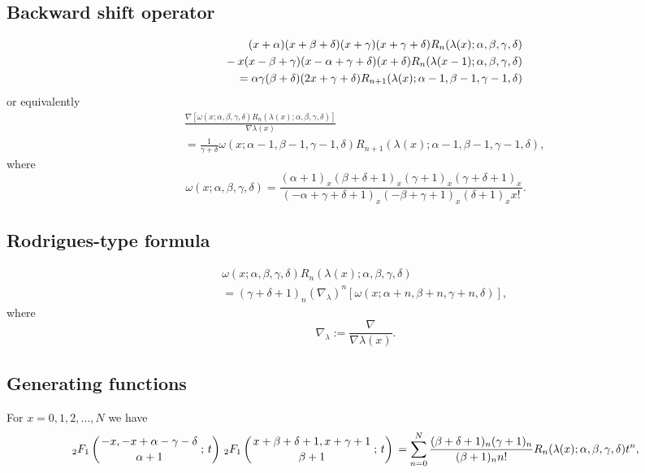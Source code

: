 \documentclass[envcountchap,graybox]{svmono}
\newcommand{\hyp}[5]{\mbox{}_{#1}{F}_{#2}
\left(\genfrac{}{}{0pt}{}{#3}{#4}\,;\,#5\right)}
\newcommand{\mathindent}{\hspace{7.5mm}}
\begin{document}
\subsection*{Backward shift operator}
\begin{eqnarray}
\label{shift2RacahI}
& &(x+\alpha)(x+\beta+\delta)(x+\gamma)(x+\gamma+\delta)R_n(\lambda(x);\alpha,\beta,\gamma,\delta)\nonumber\\
& &{}\mathindent{}-x(x-\beta+\gamma)(x-\alpha+\gamma+\delta)(x+\delta)R_n(\lambda(x-1);\alpha,\beta,\gamma,\delta)\nonumber\\
& &{}=\alpha\gamma(\beta+\delta)(2x+\gamma+\delta)R_{n+1}(\lambda(x);\alpha-1,\beta-1,\gamma-1,\delta)
\end{eqnarray}
or equivalently
\begin{eqnarray}
\label{shift2RacahII}
& &\frac{\nabla\left[\omega(x;\alpha,\beta,\gamma,\delta)R_n(\lambda(x);\alpha,\beta,\gamma,\delta)\right]}{\nabla\lambda(x)}\nonumber\\
& &{}=\frac{1}{\gamma+\delta}\omega(x;\alpha-1,\beta-1,\gamma-1,\delta)
R_{n+1}(\lambda(x);\alpha-1,\beta-1,\gamma-1,\delta),
\end{eqnarray}
where
$$\omega(x;\alpha,\beta,\gamma,\delta)=\frac{(\alpha+1)_x(\beta+\delta+1)_x(\gamma+1)_x(\gamma+\delta+1)_x}
{(-\alpha+\gamma+\delta+1)_x(-\beta+\gamma+1)_x(\delta+1)_xx!}.$$

\subsection*{Rodrigues-type formula}
\begin{eqnarray}
\label{RodRacah}
& &\omega(x;\alpha,\beta,\gamma,\delta)R_n(\lambda(x);\alpha,\beta,\gamma,\delta)\nonumber\\
& &{}=(\gamma+\delta+1)_n\left(\nabla_{\lambda}\right)^n\left[\omega(x;\alpha+n,\beta+n,\gamma+n,\delta)\right],
\end{eqnarray}
where
$$\nabla_{\lambda}:=\frac{\nabla}{\nabla\lambda(x)}.$$

\subsection*{Generating functions}
For $x=0,1,2,\ldots,N$ we have
\begin{equation}
\label{GenRacah1}
\hyp{2}{1}{-x,-x+\alpha-\gamma-\delta}{\alpha+1}{t}\,\hyp{2}{1}{x+\beta+\delta+1,x+\gamma+1}{\beta+1}{t}
{}=\sum_{n=0}^N\frac{(\beta+\delta+1)_n(\gamma+1)_n}{(\beta+1)_nn!}
R_n(\lambda(x);\alpha,\beta,\gamma,\delta)t^n,
\end{equation}
\end{document}
